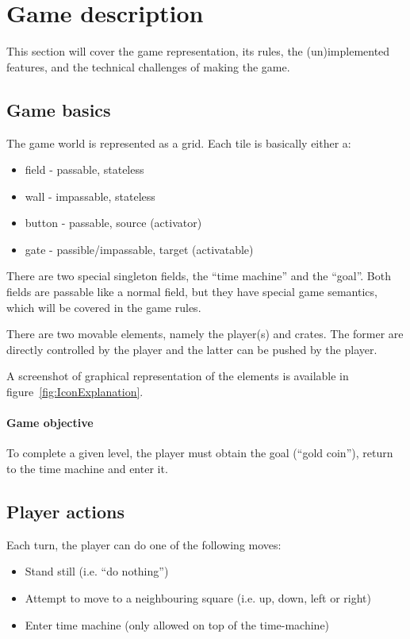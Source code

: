 \section{Game description}

This section will cover the game representation, its rules, the
(un)implemented features, and the technical challenges of making the
game.

\subsection{Game basics}
The game world is represented as a grid.  Each tile is basically
either a:

\begin{itemize}
\item field - passable, stateless
\item wall - impassable, stateless
\item button - passable, source (activator)
\item gate - passible/impassable, target (activatable)
\end{itemize}

There are two special singleton fields, the ``time machine'' and
the ``goal''.  Both fields are passable like a normal field, but
they have special game semantics, which will be covered in the
game rules.

There are two movable elements, namely the player(s) and crates.  The
former are directly controlled by the player and the latter can be
pushed by the player.

A screenshot of graphical representation of the elements is available
in figure~\ref{fig:IconExplanation}.


\paragraph{Game objective}
To complete a given level, the player must obtain the goal (``gold coin''),
return to the time machine and enter it.

\subsection{Player actions}
Each turn, the player can do one of the following moves:

\begin{itemize}
\item Stand still (i.e. ``do nothing'')
\item Attempt to move to a neighbouring square (i.e. up, down, left or right)
\item Enter time machine (only allowed on top of the time-machine)
\end{itemize}

